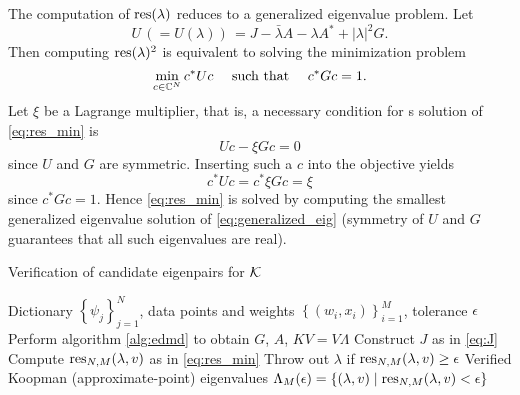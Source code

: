 The computation of $\text{res} (\lambda)$ reduces to a generalized eigenvalue problem. Let 
\begin{equation}
    U \,( = U(\lambda) )\, = J - \bar{\lambda} A - \lambda A^* + | \lambda |^2 G . 
\end{equation}
Then computing $\text{res} (\lambda)^2$ is equivalent to solving the minimization problem 
\begin{equation}
    \label{eq:res_min}
    \min_{c \in \mathbb{C}^N} c^* U c \quad \text{ such that } \quad c^* G c = 1 .  
\end{equation}
Let $\xi$ be a Lagrange multiplier, that is, a necessary condition for s solution of 
\ref{eq:res_min} is 
\begin{equation}
    \label{eq:generalized_eig}
    U c - \xi G c = 0 
\end{equation}
since $U$ and $G$ are symmetric. Inserting such a $c$ into the objective yields 
\begin{equation}
    c^* U c = c^* \xi G c = \xi
\end{equation}
since $c^* G c = 1$. Hence \ref{eq:res_min} is solved by computing the smallest 
generalized eigenvalue solution of \ref{eq:generalized_eig} (symmetry of $U$ and $G$ 
guarantees that all such eigenvalues are real). 

\begin{algorithm}
    \caption{Verification of candidate eigenpairs for $\mathcal{K}$}
    \label{alg:edmd_verified_residual}
    \begin{algorithmic}[1]
        \Require Dictionary $\left\{ \psi_j \right\}_{j=1}^N$, 
            data points and weights $\left\{ (w_i, x_i) \right\}_{i=1}^M$, 
            tolerance $\epsilon$
        \State Perform algorithm \ref{alg:edmd} to obtain $G$, $A$, $K V = V \Lambda$
        \State Construct $J$ as in \ref{eq:J}
            \State Compute $\text{res}_{N,M} (\lambda, v)$ as in \ref{eq:res_min}
            \State Throw out $\lambda$ if $\text{res}_{N,M} (\lambda, v) \geq \epsilon$
        \EndFor
        \State \Return Verified Koopman (approximate-point) eigenvalues 
        $\Lambda_M (\epsilon) = \left\{ (\lambda, v) \mid \text{res}_{N,M} (\lambda, v) < \epsilon \right\}$
    \end{algorithmic}
\end{algorithm}

